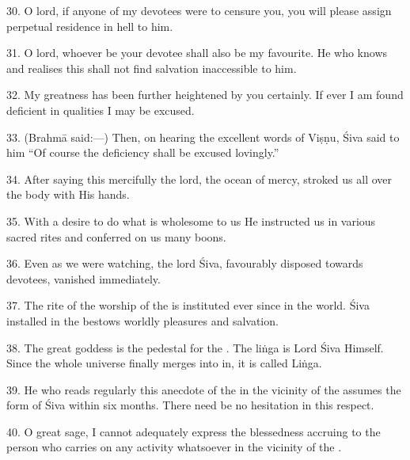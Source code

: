 30. O lord, if anyone of my devotees were to censure you, you will please assign
perpetual residence in hell to him.

31. O lord, whoever be your devotee shall also be my favourite. He who knows and
realises this shall not find salvation inaccessible to him.

32. My greatness has been further heightened by you certainly. If ever I am
found deficient in qualities I may be excused.

33. (Brahmā said:—) Then, on hearing the excellent words of Viṣṇu, Śiva said to
him “Of course the deficiency shall be excused lovingly.”

34. After saying this mercifully the lord, the ocean of mercy, stroked us all
over the body with His hands.

35. With a desire to do what is wholesome to us He instructed us in various
sacred rites and conferred on us many boons.

36. Even as we were watching, the lord Śiva, favourably disposed towards
devotees, vanished immediately.

37. The rite of the worship of the  is instituted ever since in
the world. Śiva installed in the  bestows worldly pleasures and
salvation.

38. The great goddess is the pedestal for the . The liṅga is Lord
Śiva Himself. Since the whole universe finally merges into in, it is called
Liṅga.

39. He who reads regularly this anecdote of the  in the vicinity of
the  assumes the form of Śiva within six months. There need be no
hesitation in this respect.

40. O great sage, I cannot adequately express the blessedness accruing to
the person who carries on any activity whatsoever in the vicinity of
the .
